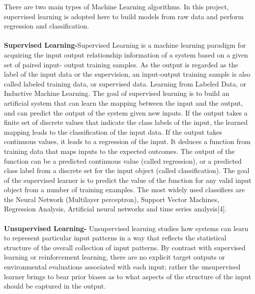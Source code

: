 There  are  two  main  types  of  Machine  Learning  algorithms.  In  this  project,  supervised learning  is  adopted  here  to  build  models  from  raw  data  and  perform  regression  and classification.
\\
\\\textbf{Supervised Learning-}Supervised Learning is a machine learning paradigm for acquiring the input output relationship information of a system based on a given set of paired input- output  training  samples.  As  the  output  is regarded  as  the  label  of  the  input  data  or  the supervision,  an  input-output  training  sample  is  also  called  labeled  training  data,  or supervised data. Learning from Labeled Data, or Inductive Machine Learning.    The goal of supervised learning is to build an artificial system that can learn the mapping between  the  input  and  the  output,  and  can  predict  the  output  of  the  system  given  new inputs. If the output takes a finite set of discrete values that indicate the class labels of the input,  the  learned  mapping  leads  to  the  classification  of  the  input  data.  If  the  output takes continuous values, it leads to a regression of the input. It deduces a function from training data that maps inputs to the expected outcomes. The output of the function can be a predicted continuous value (called regression), or a predicted class label from a discrete set  for  the  input  object  (called  classification).  The  goal  of  the  supervised  learner  is  to predict  the  value  of  the  function  for  any  valid  input  object  from a  number  of  training examples.  The  most  widely  used  classifiers  are  the  Neural  Network  (Multilayer perceptron),  Support  Vector  Machines,  Regression Analysis, Artificial neural networks and time series analysis[4].
\\
\\\textbf{Unsupervised Learning-}
Unsupervised learning studies  how  systems  can  learn  to represent  particular  input  patterns  in  a  way  that  reflects  the  statistical  structure  of  the  overall collection  of  input  patterns.  By contrast  with  supervised  learning  or  reinforcement learning, there are no explicit target outputs or environmental evaluations associated with each input; rather the unsupervised learner brings to bear prior biases as to what aspects of the structure of the input should be captured in the output.


